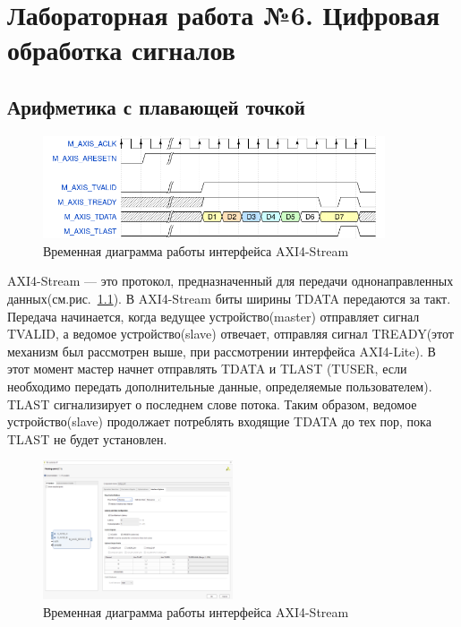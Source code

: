 \chapter{Лабораторная работа №6. Цифровая обработка сигналов}

\section{Арифметика с плавающей точкой}

\begin{figure}[h]
	\centering
	\includegraphics[width=0.9\textwidth]{image/axis_0.png}
	\caption{Временная диаграмма работы интерфейса AXI4-Stream}
	\label{axis}
\end{figure}

AXI4-Stream — это протокол, предназначенный для передачи однонаправленных данных(см.рис.~\ref{axis}). В AXI4-Stream биты ширины TDATA передаются за такт. Передача начинается, когда ведущее устройство(master) отправляет сигнал TVALID, а ведомое устройство(slave) отвечает, отправляя сигнал TREADY(этот механизм был рассмотрен выше, при рассмотрении интерфейса AXI4-Lite). В этот момент мастер начнет отправлять TDATA и TLAST (TUSER, если необходимо передать дополнительные данные, определяемые пользователем). TLAST сигнализирует о последнем слове потока. Таким образом, ведомое устройство(slave) продолжает потреблять входящие TDATA до тех пор, пока TLAST не будет установлен.

\begin{figure}[h]
	\centering
	\includegraphics[width=0.5\textwidth]{image/fp_interface_options.png}
	\caption{Временная диаграмма работы интерфейса AXI4-Stream}
	\label{fp_interface_options}
\end{figure}

